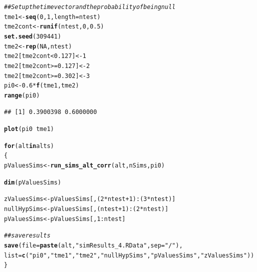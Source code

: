 \documentclass{article}\usepackage[]{graphicx}\usepackage[]{color}
\makeatletter
\newcommand{\hlnum}[1]{\textcolor[rgb]{0.686,0.059,0.569}{#1}}%
\newcommand{\hlstr}[1]{\textcolor[rgb]{0.192,0.494,0.8}{#1}}%
\newcommand{\hlcom}[1]{\textcolor[rgb]{0.678,0.584,0.686}{\textit{#1}}}%
\newcommand{\hlopt}[1]{\textcolor[rgb]{0,0,0}{#1}}%
\newcommand{\hlstd}[1]{\textcolor[rgb]{0.345,0.345,0.345}{#1}}%
\newcommand{\hlkwa}[1]{\textcolor[rgb]{0.161,0.373,0.58}{\textbf{#1}}}%
\newcommand{\hlkwb}[1]{\textcolor[rgb]{0.69,0.353,0.396}{#1}}%
\newcommand{\hlkwc}[1]{\textcolor[rgb]{0.333,0.667,0.333}{#1}}%
\newcommand{\hlkwd}[1]{\textcolor[rgb]{0.737,0.353,0.396}{\textbf{#1}}}%
\newenvironment{kframe}{%
 \def\at@end@of@kframe{}%
 \ifinner\ifhmode%
  \def\at@end@of@kframe{\end{minipage}}%
  \begin{minipage}{\columnwidth}%
 \fi\fi%
 \def\FrameCommand##1{\hskip\@totalleftmargin \hskip-\fboxsep
 \colorbox{shadecolor}{##1}\hskip-\fboxsep
     \hskip-\linewidth \hskip-\@totalleftmargin \hskip\columnwidth}%
 \MakeFramed {\advance\hsize-\width
   \@totalleftmargin\z@ \linewidth\hsize
   \@setminipage}}%
 {\par\unskip\endMakeFramed%
 \at@end@of@kframe}
\newenvironment{knitrout}{}{} %
\makeatother
\begin{document}
\begin{knitrout}
\color{fgcolor}\begin{kframe}
\begin{alltt}
\hlcom{## Set up the time vector and the probability of being null}
\hlstd{tme1} \hlkwb{<-} \hlkwd{seq}\hlstd{(}\hlnum{0}\hlstd{,}\hlnum{1}\hlstd{,}\hlkwc{length}\hlstd{=ntest)}
\hlstd{tme2cont} \hlkwb{<-} \hlkwd{runif}\hlstd{(ntest,}\hlnum{0}\hlstd{,}\hlnum{0.5}\hlstd{)}
\hlkwd{set.seed}\hlstd{(}\hlnum{309441}\hlstd{)}
\hlstd{tme2} \hlkwb{<-} \hlkwd{rep}\hlstd{(}\hlnum{NA}\hlstd{, ntest)}
\hlstd{tme2[tme2cont} \hlopt{<} \hlnum{0.127}\hlstd{]} \hlkwb{<-} \hlnum{1}
\hlstd{tme2[tme2cont} \hlopt{>=} \hlnum{0.127}\hlstd{]} \hlkwb{<-} \hlnum{2}
\hlstd{tme2[tme2cont} \hlopt{>=} \hlnum{0.302}\hlstd{]} \hlkwb{<-} \hlnum{3}
\hlstd{pi0} \hlkwb{<-} \hlnum{0.6}\hlopt{*}\hlkwd{f}\hlstd{(tme1, tme2)}
\hlkwd{range}\hlstd{(pi0)}
\end{alltt}
\begin{verbatim}
## [1] 0.3900398 0.6000000
\end{verbatim}
\begin{alltt}
\hlkwd{plot}\hlstd{(pi0} \hlopt{~} \hlstd{tme1)}

\hlkwa{for}\hlstd{(alt} \hlkwa{in} \hlstd{alts)}
\hlstd{\{}
  \hlstd{pValuesSims} \hlkwb{<-} \hlkwd{run_sims_alt_corr}\hlstd{(alt, nSims, pi0)}

  \hlkwd{dim}\hlstd{(pValuesSims)}

  \hlstd{zValuesSims} \hlkwb{<-} \hlstd{pValuesSims[,(}\hlnum{2}\hlopt{*}\hlstd{ntest}\hlopt{+}\hlnum{1}\hlstd{)}\hlopt{:}\hlstd{(}\hlnum{3}\hlopt{*}\hlstd{ntest)]}
  \hlstd{nullHypSims} \hlkwb{<-} \hlstd{pValuesSims[,(ntest}\hlopt{+}\hlnum{1}\hlstd{)}\hlopt{:}\hlstd{(}\hlnum{2}\hlopt{*}\hlstd{ntest)]}
  \hlstd{pValuesSims} \hlkwb{<-} \hlstd{pValuesSims[,}\hlnum{1}\hlopt{:}\hlstd{ntest]}

  \hlcom{##save results}
  \hlkwd{save}\hlstd{(}\hlkwc{file}\hlstd{=}\hlkwd{paste}\hlstd{(alt,} \hlstr{"simResults_4.RData"}\hlstd{,}\hlkwc{sep}\hlstd{=}\hlstr{"/"}\hlstd{),}
       \hlkwc{list}\hlstd{=}\hlkwd{c}\hlstd{(}\hlstr{"pi0"}\hlstd{,} \hlstr{"tme1"}\hlstd{,} \hlstr{"tme2"}\hlstd{,} \hlstr{"nullHypSims"}\hlstd{,}\hlstr{"pValuesSims"}\hlstd{,}\hlstr{"zValuesSims"}\hlstd{))}
\hlstd{\}}
\end{alltt}
\end{kframe}


\end{knitrout}
\end{document}
